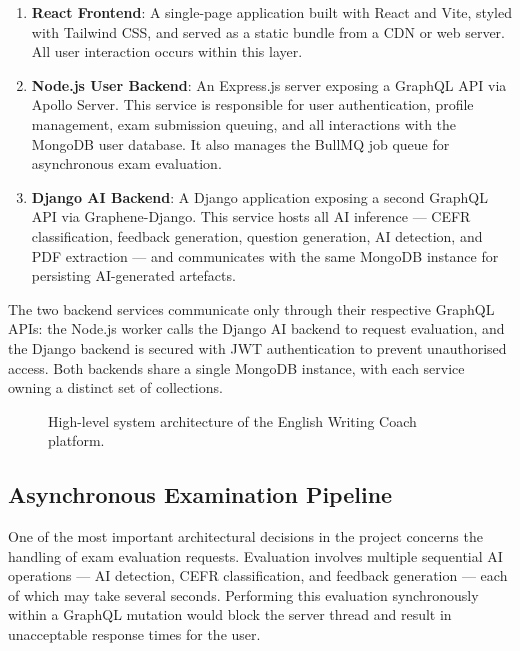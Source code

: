 \documentclass[12pt, a4paper]{report}
\begin{document}
\begin{enumerate}
    \item \textbf{React Frontend}: A single-page application built with React and Vite, styled with Tailwind CSS, and served as a static bundle from a CDN or web server. All user interaction occurs within this layer.
    \item \textbf{Node.js User Backend}: An Express.js server exposing a GraphQL API via Apollo Server. This service is responsible for user authentication, profile management, exam submission queuing, and all interactions with the MongoDB user database. It also manages the BullMQ job queue for asynchronous exam evaluation.
    \item \textbf{Django AI Backend}: A Django application exposing a second GraphQL API via Graphene-Django. This service hosts all AI inference — CEFR classification, feedback generation, question generation, AI detection, and PDF extraction — and communicates with the same MongoDB instance for persisting AI-generated artefacts.
\end{enumerate}

The two backend services communicate only through their respective GraphQL APIs: the Node.js worker calls the Django AI backend to request evaluation, and the Django backend is secured with JWT authentication to prevent unauthorised access. Both backends share a single MongoDB instance, with each service owning a distinct set of collections.

\begin{figure}[H]
    \centering
    \caption{High-level system architecture of the English Writing Coach platform.}
    \label{fig:architecture}
\end{figure}

\subsection{Asynchronous Examination Pipeline}

One of the most important architectural decisions in the project concerns the handling of exam evaluation requests. Evaluation involves multiple sequential AI operations — AI detection, CEFR classification, and feedback generation — each of which may take several seconds. Performing this evaluation synchronously within a GraphQL mutation would block the server thread and result in unacceptable response times for the user.
\end{document}
